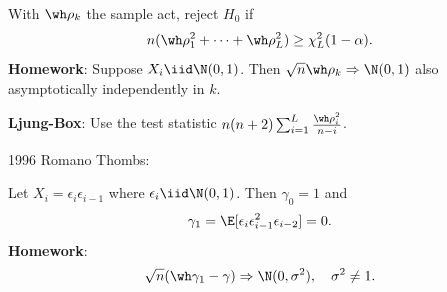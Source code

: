 With \(\wh\rho_k\) the sample act, reject \(H_0\) if
\[n(\wh \rho_1^2 + \cdots + \wh \rho_L^2) \geq \chi^2_L(1 - \alpha).\]
\textbf{Homework}: Suppose \(X_i \iid \N(0, 1)\). Then \(\sqrt{n}\wh \rho_k \Rightarrow \N(0, 1)\) also asymptotically independently in \(k\).

\textbf{Ljung-Box}: Use the test statistic \(n(n + 2)\sum_{i=1}^L \frac{\wh \rho_i^2}{n - i}\).

1996 Romano Thombs:

Let \(X_i = \epsilon_i \epsilon_{i-1}\) where \(\epsilon_i \iid \N(0, 1)\). Then \(\gamma_0 = 1\) and
\[\gamma_1 = \E[\epsilon_i\epsilon_{i-1}^2\epsilon_{i-2}] = 0.\]
\textbf{Homework}:
\[\sqrt{n}(\wh \gamma_1 - \gamma) \Rightarrow \N(0, \sigma^2), \quad \sigma^2 \neq 1.\]
